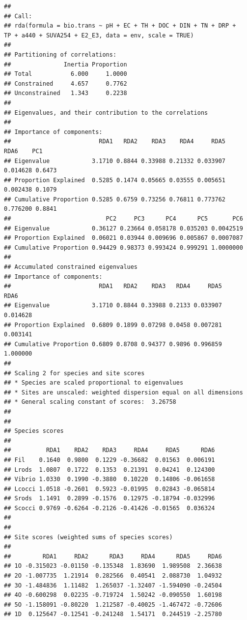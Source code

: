 \documentclass[
]{book}
\begin{document}
\begin{verbatim}
## 
## Call:
## rda(formula = bio.trans ~ pH + EC + TH + DOC + DIN + TN + DRP +      TP + a440 + SUVA254 + E2_E3, data = env, scale = TRUE) 
## 
## Partitioning of correlations:
##               Inertia Proportion
## Total           6.000     1.0000
## Constrained     4.657     0.7762
## Unconstrained   1.343     0.2238
## 
## Eigenvalues, and their contribution to the correlations 
## 
## Importance of components:
##                         RDA1   RDA2    RDA3    RDA4     RDA5     RDA6    PC1
## Eigenvalue            3.1710 0.8844 0.33988 0.21332 0.033907 0.014628 0.6473
## Proportion Explained  0.5285 0.1474 0.05665 0.03555 0.005651 0.002438 0.1079
## Cumulative Proportion 0.5285 0.6759 0.73256 0.76811 0.773762 0.776200 0.8841
##                           PC2     PC3      PC4      PC5       PC6
## Eigenvalue            0.36127 0.23664 0.058178 0.035203 0.0042519
## Proportion Explained  0.06021 0.03944 0.009696 0.005867 0.0007087
## Cumulative Proportion 0.94429 0.98373 0.993424 0.999291 1.0000000
## 
## Accumulated constrained eigenvalues
## Importance of components:
##                         RDA1   RDA2    RDA3   RDA4     RDA5     RDA6
## Eigenvalue            3.1710 0.8844 0.33988 0.2133 0.033907 0.014628
## Proportion Explained  0.6809 0.1899 0.07298 0.0458 0.007281 0.003141
## Cumulative Proportion 0.6809 0.8708 0.94377 0.9896 0.996859 1.000000
## 
## Scaling 2 for species and site scores
## * Species are scaled proportional to eigenvalues
## * Sites are unscaled: weighted dispersion equal on all dimensions
## * General scaling constant of scores:  3.26758 
## 
## 
## Species scores
## 
##          RDA1    RDA2    RDA3     RDA4     RDA5      RDA6
## Fil    0.1640  0.9800  0.1229 -0.36682  0.01563  0.006191
## Lrods  1.0807  0.1722  0.1353  0.21391  0.04241  0.124300
## Vibrio 1.0330  0.1990 -0.3880  0.10220  0.14806 -0.061658
## Lcocci 1.0518 -0.2601  0.5923 -0.01995  0.02843 -0.065814
## Srods  1.1491  0.2899 -0.1576  0.12975 -0.18794 -0.032996
## Scocci 0.9769 -0.6264 -0.2126 -0.41426 -0.01565  0.036324
## 
## 
## Site scores (weighted sums of species scores)
## 
##         RDA1     RDA2      RDA3     RDA4      RDA5     RDA6
## 1O -0.315023 -0.01150 -0.135348  1.83690  1.989508  2.36638
## 2O -1.007735  1.21914  0.282566  0.40541  2.088730  1.04932
## 3O -1.484836  1.11482  1.265037 -1.32407 -1.594090 -0.24504
## 4O -0.600298  0.02235 -0.719724  1.50242 -0.090550  1.60198
## 5O -1.158091 -0.80220  1.212587 -0.40025 -1.467472 -0.72606
## 1D  0.125647 -0.12541 -0.241248  1.54171  0.244519 -2.25780

\end{verbatim}
\end{document}
